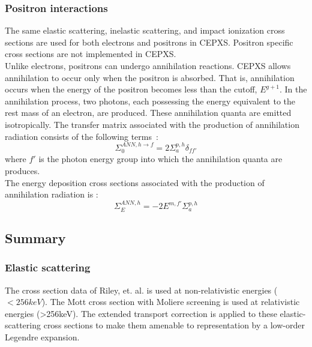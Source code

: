 \subsubsection{Positron interactions}
The same elastic scattering, inelastic scattering, and impact ionization cross
sections are used for both electrons and positrons in CEPXS. Positron specific
cross sections are not implemented in CEPXS.\\
Unlike electrons, positrons can undergo annihilation reactions. CEPXS allows
annihilation to occur only when the positron is absorbed. That is,
annihilation occurs when the energy of the positron becomes less than the
cutoff, $E^{g+1}$. In the annihilation process, two photons, each possessing
the energy equivalent to the rest mass of an electron, are produced. These
annihilation quanta are emitted isotropically. The transfer matrix associated
with the production of annihilation radiation consists of the following
\hbox{terms :}
\begin{equation}
\Sigma_{0}^{ANN,h\rightarrow f} = 2 \Sigma_{a}^{p,h} \delta_{ff'}
\end{equation}
where $f'$ is the photon energy group into which the annihilation quanta are
produces.\\
The energy deposition cross sections associated with the production of annihilation 
radiation is :
\begin{equation}
\Sigma_E^{ANN,h} = -2 E^{m,f'}\Sigma_a^{p,h}
\end{equation}

\subsection{Summary}

\subsubsection{Elastic scattering}
The cross section data of Riley, et. al. is used at non-relativistic energies
($<256 keV$). The Mott cross section with Moliere screening is used at
relativistic energies (>256keV). The extended transport correction is applied
to these elastic-scattering cross sections to make them amenable to
representation by a low-order Legendre expansion.

